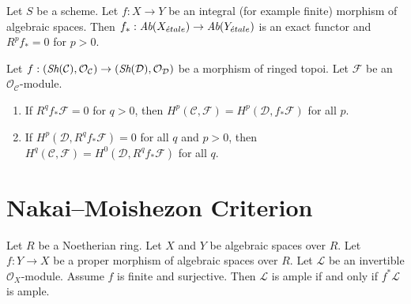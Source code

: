 \begin{lemma}
\label{lemma-finite-higher-direct-image-zero}
Let $S$ be a scheme. Let $f : X \to Y$ be an integral (for example finite)
morphism of algebraic spaces. Then
$f_* : \textit{Ab}(X_{\acute{e}tale}) \to \textit{Ab}(Y_{\acute{e}tale})$
is an exact functor and $R^pf_* = 0$ for $p > 0$.
\end{lemma}

\begin{lemma}
\label{lemma-apply-Leray}
Let $f : (\mathop{\textit{Sh}}\nolimits(\mathcal{C}), \mathcal{O}_\mathcal{C}) \to
(\mathop{\textit{Sh}}\nolimits(\mathcal{D}), \mathcal{O}_\mathcal{D})$ be a morphism of ringed topoi.
Let $\mathcal{F}$ be an $\mathcal{O}_\mathcal{C}$-module.
\begin{enumerate}
\item If $R^qf_*\mathcal{F} = 0$ for $q > 0$, then
$H^p(\mathcal{C}, \mathcal{F}) = H^p(\mathcal{D}, f_*\mathcal{F})$ for all $p$.
\item If $H^p(\mathcal{D}, R^qf_*\mathcal{F}) = 0$ for all $q$ and $p > 0$,
then $H^q(\mathcal{C}, \mathcal{F}) = H^0(\mathcal{D}, R^qf_*\mathcal{F})$
for all $q$.
\end{enumerate}
\end{lemma}



\section{Nakai--Moishezon Criterion}

\begin{lemma}
\label{lemma-surjective-finite-morphism-ample}
Let $R$ be a Noetherian ring.
Let $X$ and $Y$ be algebraic spaces over $R$.
Let $f : Y \to X$ be a proper morphism of algebraic spaces over $R$.
Let $\mathcal{L}$ be an invertible $\mathcal{O}_X$-module.
Assume $f$ is finite and surjective.
Then $\mathcal{L}$ is ample if and only if $f^*\mathcal{L}$ is ample.
\end{lemma}


